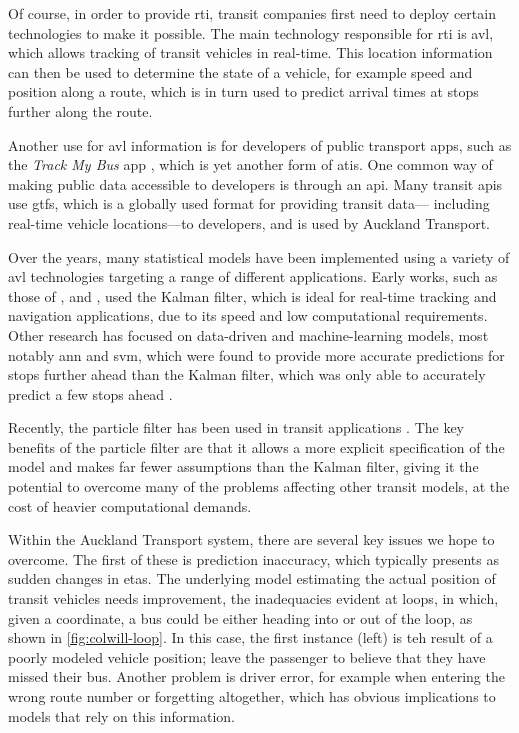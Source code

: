 \documentclass[12pt,a4paper]{article}
\newcommand{\kf}{Kalman filter}
\newcommand{\pf}{particle filter}
\begin{document}
Of course, in order to provide \gls{rti},
transit companies first need to deploy certain technologies to make it possible.
The main technology responsible for \gls{rti} is \gls{avl},
which allows tracking of transit vehicles in real-time.
This location information can then be used to determine the state of a vehicle,
for example speed and position along a route,
which is in turn used to predict arrival times at stops further along the route.


Another use for \gls{avl} information is for developers of public transport apps,
such as the \emph{Track My Bus} app \citep{trackmybus},
which is yet another form of \gls{atis}.
One common way of making public data accessible to developers is through an \gls{api}.
Many transit \glspl{api} use \gls{gtfs}, 
which is a globally used format for providing transit data---%
including real-time vehicle locations---to developers,
and is used by Auckland Transport.


Over the years, many statistical models have been implemented using a variety of \gls{avl} technologies
targeting a range of different applications.
Early works, such as those of \cite{cn}, \cite{wall-dailey:1999} and \cite{dailey:2001},
used the \kf{}, which is ideal for real-time tracking and navigation applications,
due to its speed and low computational requirements.
Other research has focused on data-driven and machine-learning models,
most notably \gls{ann} and \gls{svm},
which were found to provide more accurate predictions for stops further ahead
than the \kf{}, which was only able to accurately predict a few stops ahead
\citep{cn}.


Recently, the \pf{} has been used in transit applications \citep{cn,chen-rakha:2014,hans-etal:2015}.
The key benefits of the \pf{} are that it allows a more explicit specification of the model
and makes far fewer assumptions than the \kf{},
giving it the potential to overcome many of the problems affecting other transit models,
at the cost of heavier computational demands.


Within the Auckland Transport system, there are several key issues we hope to overcome.
The first of these is prediction inaccuracy,
which typically presents as sudden changes in \glspl{eta}.
The underlying model estimating the actual position of transit vehicles needs improvement,
the inadequacies evident at loops, in which, given a coordinate,
a bus could be either heading into or out of the loop,
as shown in \cref{fig:colwill-loop}.
In this case, the first instance (left) is teh result of a poorly modeled vehicle position;
leave the passenger to believe that they have missed their bus.
Another problem is driver error, 
for example when entering the wrong route number or forgetting altogether,
which has obvious implications to models that rely on this information.
\end{document}
